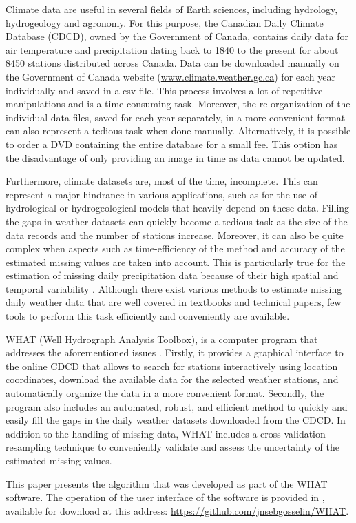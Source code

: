 \documentclass[ARTICLETHERMIC.tex]{subfiles}
\begin{document}
Climate data are useful in several fields of Earth sciences, including hydrology, hydrogeology and agronomy. For this purpose, the Canadian Daily Climate Database (CDCD), owned by the Government of Canada, contains daily data for air temperature and precipitation dating back to 1840 to the present for about 8450 stations distributed across Canada. Data can be downloaded manually on the Government of Canada website (\url{www.climate.weather.gc.ca}) for each year individually and saved in a csv file. This process involves a lot of repetitive manipulations and is a time consuming task. Moreover, the re-organization of the individual data files, saved for each year separately, in a more convenient format can also represent a tedious task when done manually. Alternatively, it is possible to order a DVD containing the entire database for a small fee. This option has the disadvantage of only providing an image in time as data cannot be updated.  

Furthermore, climate datasets are, most of the time, incomplete. This can represent a major hindrance in various applications, such as for the use of hydrological or hydrogeological models that heavily depend on these data. Filling the gaps in weather datasets can quickly become a tedious task as the size of the data records and the number of stations increase. Moreover, it can also be quite complex when aspects such as time-efficiency of the method and accuracy of the estimated missing values are taken into account. This is particularly true for the estimation of missing daily precipitation data because of their high spatial and temporal variability \citep{simolo_improving_2010}. Although there exist various methods to estimate missing daily weather data that are well covered in textbooks and technical papers, few tools to perform this task efficiently and conveniently are available. 

WHAT (Well Hydrograph Analysis Toolbox), is a computer program that addresses the aforementioned issues \citep{gosselin_user_2015}. Firstly, it provides a graphical interface to the online CDCD that allows to search for stations interactively using location coordinates, download the available data for the selected weather stations, and automatically organize the data in a more convenient format. Secondly, the program also includes an automated, robust, and efficient method to quickly and easily fill the gaps in the daily weather datasets downloaded from the CDCD. In addition to the handling of missing data, WHAT includes a cross-validation resampling technique to conveniently validate and assess the uncertainty of the estimated missing values.

This paper presents the algorithm that was developed as part of the WHAT software. The operation of the user interface of the software is provided in \cite{gosselin_what_2015}, available for download at this address: \url{https://github.com/jnsebgosselin/WHAT}.

\end{document}

